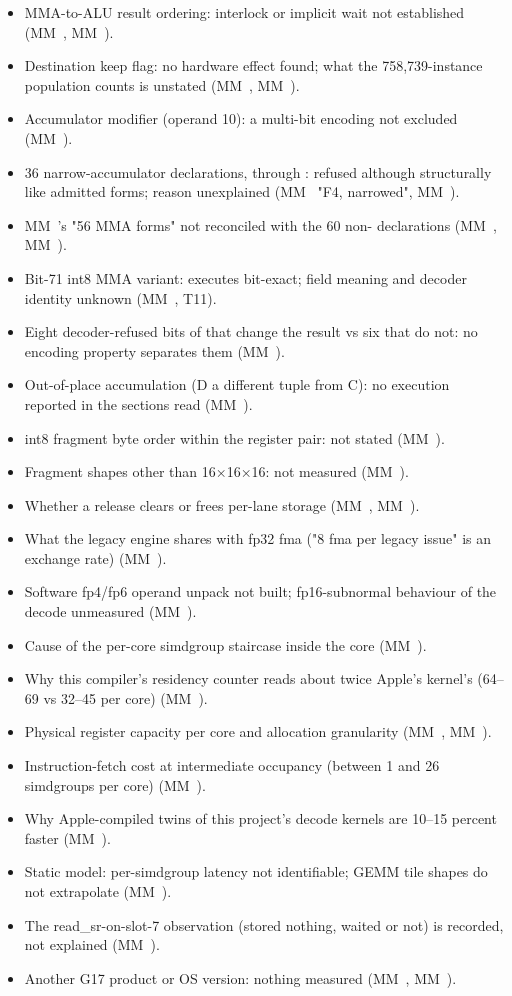 \begin{itemize}
\item MMA-to-ALU result ordering: interlock or implicit wait not established (MM~, MM~).
\item Destination keep flag: no hardware effect found; what the 758,739-instance population counts is unstated (MM~, MM~).
\item Accumulator modifier (operand 10): a multi-bit encoding not excluded (MM~).
\item 36 narrow-accumulator declarations,  through : refused although structurally like admitted forms; reason unexplained (MM~ "F4, narrowed", MM~).
\item MM~'s "56 MMA forms" not reconciled with the 60 non- declarations (MM~, MM~).
\item Bit-71 int8 MMA variant: executes bit-exact; field meaning and decoder identity unknown (MM~, T11).
\item Eight decoder-refused bits of  that change the result vs six that do not: no encoding property separates them (MM~).
\item Out-of-place accumulation (D a different tuple from C): no execution reported in the sections read (MM~).
\item int8 fragment byte order within the register pair: not stated (MM~).
\item Fragment shapes other than 16×16×16: not measured (MM~).
\item Whether a release clears or frees per-lane storage (MM~, MM~).
\item What the legacy engine shares with fp32 fma ("8 fma per legacy issue" is an exchange rate) (MM~).
\item Software fp4/fp6 operand unpack not built; fp16-subnormal behaviour of the decode unmeasured (MM~).
\item Cause of the per-core simdgroup staircase inside the core (MM~).
\item Why this compiler's residency counter reads about twice Apple's kernel's (64–69 vs 32–45 per core) (MM~).
\item Physical register capacity per core and allocation granularity (MM~, MM~).
\item Instruction-fetch cost at intermediate occupancy (between 1 and 26 simdgroups per core) (MM~).
\item Why Apple-compiled twins of this project's decode kernels are 10–15 percent faster (MM~).
\item Static model: per-simdgroup latency not identifiable; GEMM tile shapes do not extrapolate (MM~).
\item The read\_sr-on-slot-7 observation (stored nothing, waited or not) is recorded, not explained (MM~).
\item Another G17 product or OS version: nothing measured (MM~, MM~).
\end{itemize}
